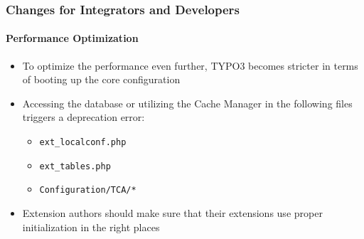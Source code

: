 %

\begin{frame}[fragile]
	\frametitle{Changes for Integrators and Developers}
	\framesubtitle{Performance Optimization}


	\begin{itemize}
		\item To optimize the performance even further, TYPO3 becomes stricter
			in terms of booting up the core configuration
		\item Accessing the database or utilizing the Cache Manager in the
		 	following files triggers a deprecation error:
			\begin{itemize}
				\item \texttt{ext\_localconf.php}
				\item \texttt{ext\_tables.php}
				\item \texttt{Configuration/TCA/*}
			\end{itemize}
		\item Extension authors should make sure that their extensions use
			proper initialization in the right places
	\end{itemize}
\end{frame}

